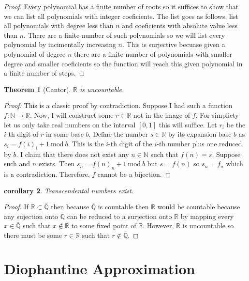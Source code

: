 \documentclass{article}
\newcommand{\N}{\mathbb{N}}
\newcommand{\Q}{\mathbb{Q}}
\newcommand{\R}{\mathbb{R}}
\theoremstyle{theorem}
\newtheorem{theorem}{Theorem}[section]
\newtheorem{corollary}[theorem]{corollary}
\theoremstyle{definition}
\theoremstyle{definition}
\theoremstyle{remark}
\theoremstyle{definition}
\theoremstyle{remark}
\begin{document}
\begin{proof}
Every polynomial has a finite number of roots so it suffices to show that we can list all polynomials with integer coeficients. The list goes as follows, list all polynomials with degree less than $n$ and coeficients with absolute value less than $n$. There are a finite number of such polynomials so we will list every polynomial by incimentally increasing $n$. This is surjective becuase given a polynomial of degree $n$ there are a finite number of polynomials with smaller degree and smaller coeficients so the function will reach this given polynomial in a finite number of steps.   
\end{proof}

\begin{theorem}[Cantor]
$\R$ is uncountable.
\end{theorem}

\begin{proof}
This is a classic proof by contradiction. Suppose I had such a function $f : \N \to \R$. Now, I will construct some $r \in \R$ not in the image of $f$. For simplicty let us only take real numbers on the interval $[0, 1]$ this will suffice. Let $r_i$ be the $i$-th digit of $r$ in some base $b$. Define the number $s \in \R$ by its expansion base $b$ as $s_i = f(i)_i + 1 \: \mathrm{mod} \: b$. This is the $i$-th digit of the $i$-th number plus one reduced by $b$. I claim that there does not exist any $n \in \N$ such that $f(n) = s$. Suppose such and $n$ exists. Then $s_n = f(n)_n + 1 \: \mathrm{mod} \: b$ but $s = f(n)$ so $s_n = f_n$ which is a contradiction. Therefore, $f$ cannot be a bijection.   
\end{proof}

\begin{corollary}
Transcendental numbers exist.
\end{corollary}

\begin{proof}
If $\R \subset \bar{\Q}$ then because $\bar{\Q}$ is countable then $\R$ would be countable because any sujection onto $\bar{\Q}$ can be reduced to a surjection onto $\R$ by mapping every $x \in \bar{\Q}$ such that $x \notin \R$ to some fixed point of $\R$. However, $\R$ is uncountable so there must be some $r \in \R$ such that $r \notin \bar{\Q}$. 
\end{proof}

\section{Diophantine Approximation}
\end{document}
